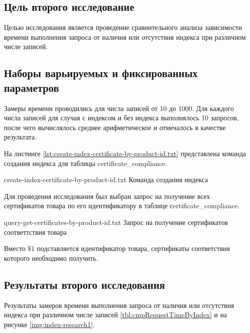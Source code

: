 \subsection{Цель второго исследование}

Целью исследования является проведение сравнительного анализа зависимости времени выполнения запроса от наличия или отсутствия индекса при различном числе записей.

\subsection{Наборы варьируемых и фиксированных параметров}

Замеры времени проводились для числа записей от 10 до 1000. Для каждого числа записей для случая с индексом и без индекса выполнялось 10 запросов, после чего вычислялось среднее арифметическое и отмечалось в качестве результата.

На листинге \ref{lst:create-index-certificate-by-product-id.txt} представлена команда создания индекса для таблицы certificate\_compliance.

{create-index-certificate-by-product-id.txt} %
{Команда создания индекса} %

\clearpage

Для проведения исследования был выбран запрос на получение всех сертификатов товара по его идентификатору в таблице сertificate\_compliance.

{query-get-certificates-by-product-id.txt} %
{Запрос на получение сертификатов соответтствия товара} %

Вместо $\$1$ подставляется идентификатор товара, сертификаты соответствия которого необходимо получить.

\subsection{Результаты второго исследования}

Результаты замеров времени выполнения запроса от наличия или отсутствия индекса при различном числе записей \ref{tbl:cmpRequestTimeByIndex} и на рисунке \ref{img:index-research1}.


